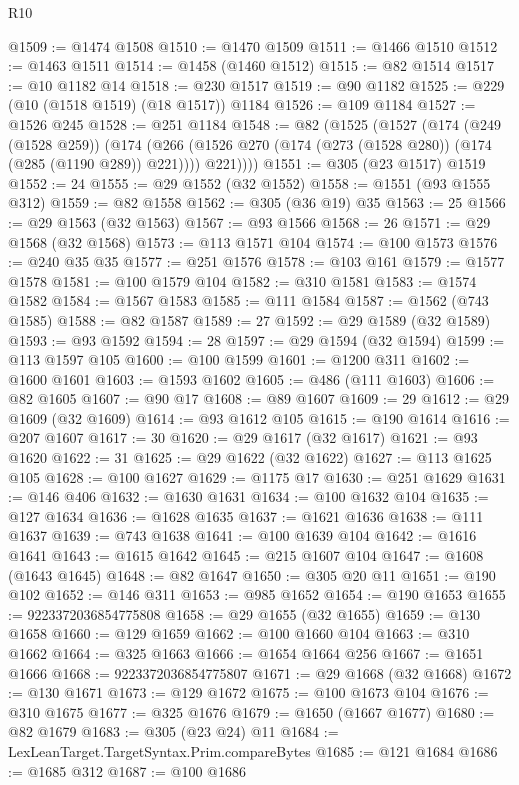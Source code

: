 \begin{lexlean}{R10}
\begin{coremodule}
@1509 := @1474 @1508
@1510 := @1470 @1509
@1511 := @1466 @1510
@1512 := @1463 @1511
@1514 := @1458 (@1460 @1512)
@1515 := @82 @1514
@1517 := @10 @1182 @14
@1518 := @230 @1517
@1519 := @90 @1182
@1525 := @229 (@10 (@1518 @1519) (@18 @1517)) @1184
@1526 := @109 @1184
@1527 := @1526 @245
@1528 := @251 @1184
@1548 := @82
    (@1525
      (@1527
        (@174
          (@249 (@1528 @259))
          (@174
            (@266 (@1526 @270 (@174 (@273 (@1528 @280)) (@174 (@285 (@1190 @289)) @221))))
            @221))))
@1551 := @305 (@23 @1517) @1519
@1552 := 24
@1555 := @29 @1552 (@32 @1552)
@1558 := @1551 (@93 @1555 @312)
@1559 := @82 @1558
@1562 := @305 (@36 @19) @35
@1563 := 25
@1566 := @29 @1563 (@32 @1563)
@1567 := @93 @1566
@1568 := 26
@1571 := @29 @1568 (@32 @1568)
@1573 := @113 @1571 @104
@1574 := @100 @1573
@1576 := @240 @35 @35
@1577 := @251 @1576
@1578 := @103 @161
@1579 := @1577 @1578
@1581 := @100 @1579 @104
@1582 := @310 @1581
@1583 := @1574 @1582
@1584 := @1567 @1583
@1585 := @111 @1584
@1587 := @1562 (@743 @1585)
@1588 := @82 @1587
@1589 := 27
@1592 := @29 @1589 (@32 @1589)
@1593 := @93 @1592
@1594 := 28
@1597 := @29 @1594 (@32 @1594)
@1599 := @113 @1597 @105
@1600 := @100 @1599
@1601 := @1200 @311
@1602 := @1600 @1601
@1603 := @1593 @1602
@1605 := @486 (@111 @1603)
@1606 := @82 @1605
@1607 := @90 @17
@1608 := @89 @1607
@1609 := 29
@1612 := @29 @1609 (@32 @1609)
@1614 := @93 @1612 @105
@1615 := @190 @1614
@1616 := @207 @1607
@1617 := 30
@1620 := @29 @1617 (@32 @1617)
@1621 := @93 @1620
@1622 := 31
@1625 := @29 @1622 (@32 @1622)
@1627 := @113 @1625 @105
@1628 := @100 @1627
@1629 := @1175 @17
@1630 := @251 @1629
@1631 := @146 @406
@1632 := @1630 @1631
@1634 := @100 @1632 @104
@1635 := @127 @1634
@1636 := @1628 @1635
@1637 := @1621 @1636
@1638 := @111 @1637
@1639 := @743 @1638
@1641 := @100 @1639 @104
@1642 := @1616 @1641
@1643 := @1615 @1642
@1645 := @215 @1607 @104
@1647 := @1608 (@1643 @1645)
@1648 := @82 @1647
@1650 := @305 @20 @11
@1651 := @190 @102
@1652 := @146 @311
@1653 := @985 @1652
@1654 := @190 @1653
@1655 := 9223372036854775808
@1658 := @29 @1655 (@32 @1655)
@1659 := @130 @1658
@1660 := @129 @1659
@1662 := @100 @1660 @104
@1663 := @310 @1662
@1664 := @325 @1663
@1666 := @1654 @1664 @256
@1667 := @1651 @1666
@1668 := 9223372036854775807
@1671 := @29 @1668 (@32 @1668)
@1672 := @130 @1671
@1673 := @129 @1672
@1675 := @100 @1673 @104
@1676 := @310 @1675
@1677 := @325 @1676
@1679 := @1650 (@1667 @1677)
@1680 := @82 @1679
@1683 := @305 (@23 @24) @11
@1684 := LexLeanTarget.TargetSyntax.Prim.compareBytes
@1685 := @121 @1684
@1686 := @1685 @312
@1687 := @100 @1686

\end{coremodule}
\end{lexlean}
